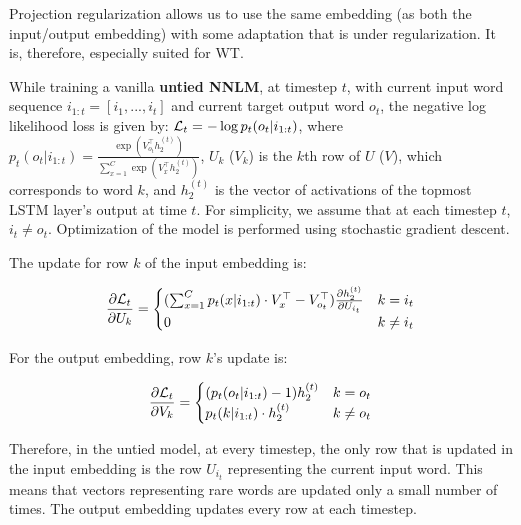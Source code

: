 \documentclass[11pt]{article}
\begin{document}
Projection regularization allows us to use the same embedding (as both the input/output embedding) with some adaptation that is under regularization. It is, therefore, especially suited for WT. 

%
While training a vanilla {\bf untied NNLM}, at timestep $t$, with current input word sequence $i_{1:t} = [i_1,...,i_t]$ and current target output word $o_t$, the negative log likelihood loss is given by:
%
${\cal L}_t = -\log  p_t(o_t|i_{1:t}) $, 
%
where $p_t(o_t|i_{1:t}) = \frac{\exp{(V_{o_t}^\top h_2^{(t)})}}{\sum_{x=1}^{C} \exp({{V_x^\top h_2^{(t)}}})   }$, $U_k$ ($V_k$) is the $k$th row of $U$ ($V$), which corresponds to word $k$, and $h_2^{(t)}$ is the vector of activations of the topmost LSTM layer's output at time $t$. For simplicity, we assume that at each timestep $t$, $i_t\neq o_t$. Optimization of the model is performed using stochastic gradient descent. 

The update for row $k$ of the input embedding is:
%
%
%
%

%

%


%
%
%

\begin{small}
\begin{equation*} %
\frac{\partial {\cal L}_t}{\partial U_k} = 
\begin{cases}
%

(   {\sum_{x=1}^{C} p_t(x|i_{1:t}) \cdot V_x^\top}  - V_{o_t}^\top) \frac{\partial h_2^{(t)}} {\partial U_{i_t}}      

%
& k = i_t  \\


 0 & k \neq i_t \\
\end{cases} 
\end{equation*}
\end{small}
For the output embedding, row $k$'s update is: 
\begin{small}
\begin{equation*}
\frac{\partial {\cal L}_t}{\partial V_k} = 
\begin{cases}
( p_t(o_t|i_{1:t}) -1 ) h_2^{(t)}      & k=o_t\\
 p_t(k|i_{1:t}) \cdot h_2^{(t)}      & k \neq o_t\\                    
\end{cases}
\end{equation*}
\end{small}
Therefore, in the untied model, at every timestep, the only row that is updated in the input embedding is the row $U_{i_t}$ representing the current input word.  This means that vectors representing rare words are updated only a small number of times. The output embedding updates every row at each timestep.
\end{document}
